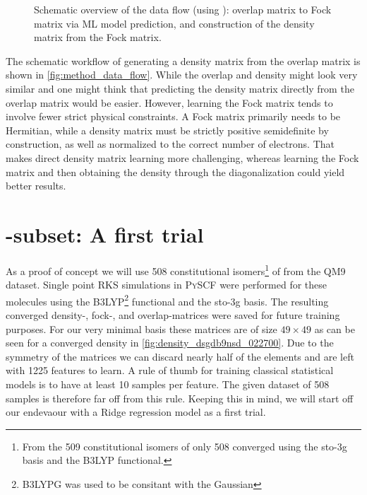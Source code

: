 \begin{figure}[H]
    \caption[Schematic overview data flow]{Schematic overview of the data flow (using ): overlap matrix to Fock matrix via ML model prediction, and construction of the density matrix from the Fock matrix.}
    \label{fig:method_data_flow}
\end{figure}

The schematic workflow of generating a density matrix from the overlap matrix is shown in \autoref{fig:method_data_flow}. While the overlap and density might look very similar and one might think that predicting the density matrix directly from the overlap matrix would be easier. However, learning the Fock matrix tends to involve fewer strict physical constraints. A Fock matrix primarily needs to be Hermitian, while a density matrix must be strictly positive semidefinite by construction, as well as normalized to the correct number of electrons. That makes direct density matrix learning more challenging, whereas learning the Fock matrix and then obtaining the density through the diagonalization could yield better results. 

\section{-subset: A first trial}
\label{sec:qm9_c5h4n2o2}

As a proof of concept we will use 508 constitutional isomers\footnote{From the 509 constitutional isomers of  only 508 converged using the sto-3g basis and the B3LYP functional.} of  from the QM9 dataset. 
Single point RKS simulations in \textsc{PySCF} \parencite{ref:pyscf} were performed for these molecules using the B3LYP\footnote{B3LYPG was used to be consitant with the Gaussian} functional and the sto-3g basis. The resulting converged density-, fock-, and overlap-matrices were saved for future training purposes. For our very minimal basis these matrices are of size $49 \times 49$ as can be seen for a converged density in \autoref{fig:density_dsgdb9nsd_022700}. 
Due to the symmetry of the matrices we can discard nearly half of the elements and are left with 1225 features to learn. A rule of thumb for training classical statistical models is to have at least 10 samples per feature. \parencite{ref:rule_of_10} The given dataset of 508 samples is therefore far off from this rule. Keeping this in mind, we will start off our endevaour with a Ridge regression model as a first trial. 


